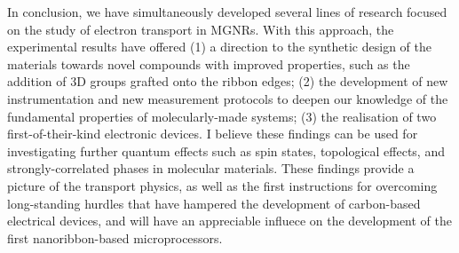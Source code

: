 In conclusion, we have simultaneously developed several lines of research focused on the study of electron transport in \glspl{MGNR}. With this approach, the experimental results have offered (1) a direction to the synthetic design of the materials towards novel compounds with improved properties, such as the addition of 3D groups grafted onto the ribbon edges; (2) the development of new instrumentation and new measurement protocols to deepen our knowledge of the fundamental  properties of molecularly-made systems; (3) the realisation of two first-of-their-kind electronic devices. I believe these findings can be used for investigating further quantum effects such as spin states, topological effects, and strongly-correlated phases in molecular materials. These findings provide a picture of the transport physics, as well as the first instructions for overcoming long-standing hurdles that have hampered the development of carbon-based electrical devices, and will have an appreciable influece on the development of the first nanoribbon-based microprocessors.
